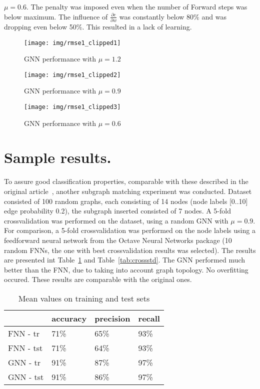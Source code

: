 \documentclass[a4paper, 11pt, twocolumn]{spie}  %
\begin{document}
$\mu = 0.6$. The penalty was imposed even when the number of Forward steps was below maximum. The influence of $\frac{\partial e}{\partial w}$ was constantly below 80\% and was dropping even below 50\%. This resulted in a lack of learning.

\begin{figure}
\begin{center}
	\texttt{[image: img/rmse1\_clipped1]}
	\caption{GNN performance with $\mu = 1.2$}
	\label{fig:rmse1}
\end{center}
\end{figure}

\begin{figure}
\begin{center}
	\texttt{[image: img/rmse1\_clipped2]}
	\caption{GNN performance with $\mu = 0.9$}
	\label{fig:rmse2}
\end{center}
\end{figure}

\begin{figure}
\begin{center}
	\texttt{[image: img/rmse1\_clipped3]}
	\caption{GNN performance with $\mu = 0.6$}
	\label{fig:rmse3}
\end{center}
\end{figure}

\section{Sample results.}
To assure good classification properties, comparable with these described in the original article~\cite{scarselli2009graph}, another subgraph matching experiment was conducted. Dataset consisted of 100 random graphs, each consisting of 14 nodes (node labels [0..10] edge probability 0.2), the subgraph inserted consisted of 7 nodes. A 5-fold crossvalidation was performed on the dataset, using a random GNN with $\mu = 0.9$. For comparison, a 5-fold crossvalidation was performed on the node labels using a feedforward neural network from the Octave Neural Networks package (10 random FNNs, the one with best crossvalidation results was selected). The results are presented int Table~\ref{tab:crossmean} and Table~\ref{tab:crossstd}. The GNN performed much better than the FNN, due to taking into account graph topology. No overfitting occured. These results are comparable with the original ones.

\begin{table}[h!]
	\begin{center}
	\begin{tabular}{llll}
	\toprule
	& accuracy & precision & recall \\
	\midrule
	FNN - tr &	71\% &  65\% & 93\% \\
	FNN - tst &	71\% &  64\% &  93\% \\
	GNN - tr &	91\% &  87\%&  97\% \\
	GNN - tst &	91\% &  86\% &  97\% \\
	\bottomrule
	\end{tabular}
	\caption{Mean values on training and test sets}
	\label{tab:crossmean}
	\end{center}
\end{table}
\end{document}
